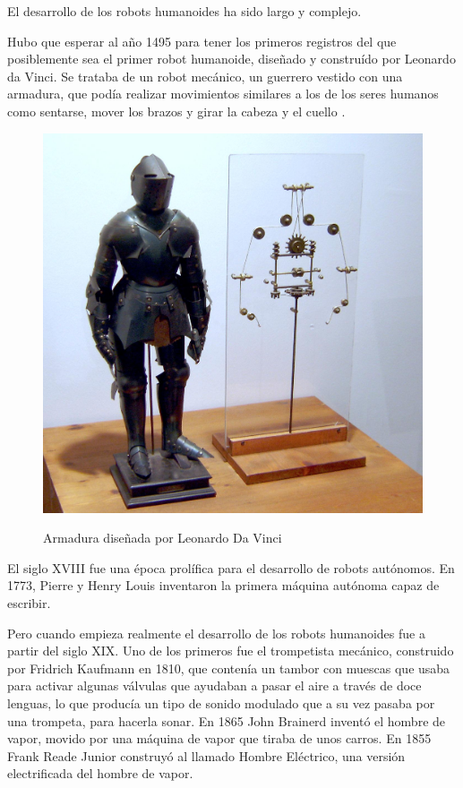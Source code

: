El desarrollo de los robots humanoides ha sido largo y complejo.

Hubo que esperar al año 1495 para tener los primeros registros del que posiblemente sea el primer robot humanoide, diseñado y construído por Leonardo da Vinci. Se trataba de un robot mecánico, un guerrero vestido con una armadura, que podía realizar movimientos similares a los de los seres humanos como sentarse, mover los brazos y girar la cabeza y el cuello \cite{ref7}.

\begin{figure}[H]
\centering
{\includegraphics[scale=0.1]{imagenes/apartado_2/26_robot_LeonardoDaVinci}}
\caption{Armadura diseñada por Leonardo Da Vinci}
\label{figura26}
\end{figure}

El siglo XVIII fue una época prolífica para el desarrollo de robots autónomos. En 1773, Pierre y Henry Louis inventaron la primera máquina autónoma capaz de escribir.

Pero cuando empieza realmente el desarrollo de los robots humanoides fue a partir del siglo XIX. Uno de los primeros fue el trompetista mecánico, construido por Fridrich Kaufmann en 1810, que contenía un tambor con muescas que usaba para activar algunas válvulas que ayudaban a pasar el aire a través de doce lenguas, lo que producía un tipo de sonido modulado que a su vez pasaba por una trompeta, para hacerla sonar. En 1865 John Brainerd inventó el hombre de vapor, movido por una máquina de vapor que tiraba de unos carros. En 1855 Frank Reade Junior construyó al llamado Hombre Eléctrico, una versión electrificada del hombre de vapor.

